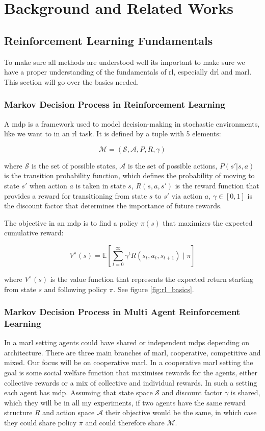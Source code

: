 \documentclass[UKenglish]{uiomasterthesis}
\begin{document}
\medskip
\chapter{Background and Related Works}

\section{Reinforcement Learning Fundamentals}
To make sure all methods are understood well its important to make sure we have a proper understanding of the fundamentals of \ac{rl}, especially \ac{drl} and \ac{marl}. This section will go over the basics needed.


\subsection{Markov Decision Process in Reinforcement Learning}

A \ac{mdp} is a framework used to model decision-making in stochastic environments, like we want to in an \ac{rl} task. It is defined by a tuple with 5 elements:

$$\mathcal{M} = (\mathcal{S}, \mathcal{A}, P, R, \gamma)$$

where \(\mathcal{S}\) is the set of possible states, \(\mathcal{A}\) is the set of possible actions, \(P(s' | s, a)\) is the transition probability function, which defines the probability of moving to state \(s'\) when action \(a\) is taken in state \(s\), \(R(s, a, s')\) is the reward function that provides a reward for transitioning from state \(s\) to \(s'\) via action \(a\), \(\gamma \in [0,1]\) is the discount factor that determines the importance of future rewards.

The objective in an \ac{mdp} is to find a policy \(\pi(s)\) that maximizes the expected cumulative reward:

$$V^\pi(s) = \mathbb{E} \left[ \sum_{t=0}^{\infty} \gamma^t R(s_t, a_t, s_{t+1}) \mid \pi \right]$$

where \(V^\pi(s)\) is the value function that represents the expected return starting from state \(s\) and following policy \(\pi\). See figure \ref{fig:rl_basics}.


\subsection{Markov Decision Process in Multi Agent Reinforcement Learning}
In a \ac{marl} setting agents could have shared or independent \acp{mdp} depending on architecture. There are three main branches of \ac{marl}, cooperative, competitive and mixed. Our focus will be on cooperative \ac{marl}.
In a cooperative \ac{marl} setting the goal is some social welfare function that maximises rewards for the agents, either collective rewards or a mix of collective and individual rewards. In such a setting each agent has \ac{mdp}. Assuming that state space \(\mathcal{S}\) and discount factor \(\gamma\) is shared, which they will be in all my experiments, if two agents have the same reward structure $R$ and action space \(\mathcal{A}\) their objective would be the same, in which case they could share policy \(\pi\) and could therefore share \(\mathcal{M}\).
\end{document}
